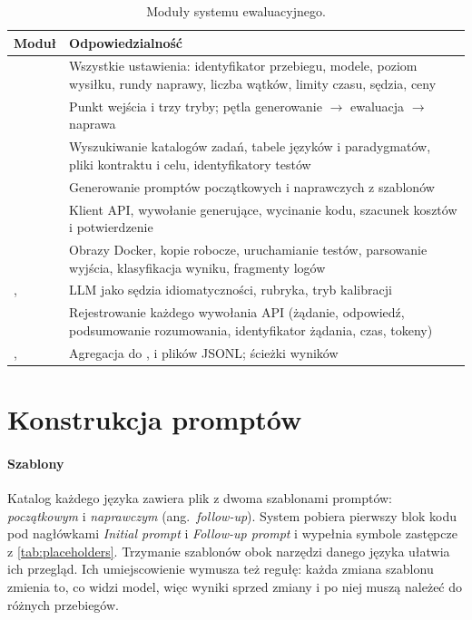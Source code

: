 \begin{table}[htbp]
  \centering
  \caption{Moduły systemu ewaluacyjnego.}
  \label{tab:modules}
  \small
  \begin{tabularx}{\textwidth}{@{}lY@{}}
    \toprule
    Moduł & Odpowiedzialność \\
    \midrule
        & Wszystkie ustawienia: identyfikator przebiegu, modele, poziom wysiłku, rundy naprawy, liczba wątków, limity czasu, sędzia, ceny \\
           & Punkt wejścia i trzy tryby; pętla generowanie $\to$ ewaluacja $\to$ naprawa \\
         & Wyszukiwanie katalogów zadań, tabele języków i paradygmatów, pliki kontraktu i celu, identyfikatory testów \\
       & Generowanie promptów początkowych i naprawczych z szablonów \\
           & Klient API, wywołanie generujące, wycinanie kodu, szacunek kosztów i potwierdzenie \\
     & Obrazy Docker, kopie robocze, uruchamianie testów, parsowanie wyjścia, klasyfikacja wyniku, fragmenty logów \\
    ,  & LLM jako sędzia idiomatyczności, rubryka, tryb kalibracji \\
       & Rejestrowanie każdego wywołania API (żądanie, odpowiedź, podsumowanie rozumowania, identyfikator żądania, czas, tokeny) \\
    ,  & Agregacja do ,  i plików JSONL; ścieżki wyników \\
    \bottomrule
  \end{tabularx}
\end{table}

\section{Konstrukcja promptów}
\label{sec:prompts}

\paragraph{Szablony} Katalog każdego języka zawiera plik  z dwoma szablonami
promptów: \emph{początkowym} i \emph{naprawczym} (ang.~\emph{follow-up}). System pobiera pierwszy blok
kodu pod nagłówkami \emph{Initial prompt} i \emph{Follow-up prompt} i wypełnia symbole zastępcze
z \cref{tab:placeholders}. Trzymanie szablonów obok narzędzi danego języka ułatwia ich przegląd.
Ich umiejscowienie wymusza też regułę: każda zmiana szablonu zmienia to, co widzi model, więc wyniki
sprzed zmiany i po niej muszą należeć do różnych przebiegów.

